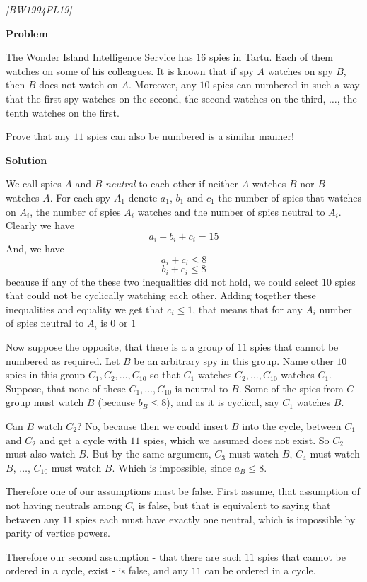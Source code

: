 
%
%

\renewcommand{\theenumi}{\alph{enumi}}



\noindent
 
\filbreak

\begin{problem}
\textit{[BW1994PL19]}


\textbf{Problem}

The Wonder Island Intelligence Service has $16$ spies in Tartu. Each of them watches on some of his colleagues. It is known that if spy $A$ watches on spy $B$, then $B$ does not watch on $A$. Moreover, any $10$ spies can numbered in such a way that the first spy watches on the second, the second watches on the third, $ \dots $, the tenth watches on the first. 

Prove that any $11$ spies can also be numbered is a similar manner!


\textbf{Solution}

We call spies $A$ and $B$ \textit{neutral} to each other if neither $A$ watches $B$ nor $B$ watches $A$. For each spy $A_1$ denote $a_1$, $b_1$ and $c_1$ the number of spies that watches on $A_i$, the number of spies $A_i$ watches and the number of spies neutral to $A_i$. Clearly we have
$$
a_i+b_i+c_i = 15
$$
And, we have 
$$
a_i+c_i \le 8
$$
$$
b_i+c_i \le 8
$$
because if any of the these two inequalities did not hold, we could select $10$ spies that could not be cyclically watching each other. Adding together these inequalities and equality we get that $c_i \le 1$, that means that for any $A_i$ number of spies neutral to $A_i$ is $0$ or $1$

Now suppose the opposite, that there is a a group of $11$ spies that cannot be numbered as required. Let $B$ be an arbitrary spy in this group. Name other $10$ spies in this group $C_1, C_2, \dots, C_{10}$ so that $C_1$ watches $C_2, \dots, C_{10}$ watches $C_1$. Suppose, that none of these $C_1, \dots, C_{10}$ is neutral to $B$. Some of the spies from $C$ group must watch $B$ (because $b_B \le 8$), and as it is cyclical, say $C_1$ watches $B$. 

Can $B$ watch $C_2$? No, because then we could insert $B$ into the cycle, between $C_1$ and $C_2$ and get a cycle with $11$ spies, which we assumed does not exist. So $C_2$ must also watch $B$. But by the same argument, $C_3$ must watch $B$, $C_4$ must watch $B$, $\dots$, $C_{10}$ must watch $B$. Which is impossible, since $a_B \le 8$. 

Therefore one of our assumptions must be false. First assume, that assumption of not having neutrals among $C_i$ is false, but that is equivalent to saying that between any $11$ spies each must have exactly one neutral, which is impossible by parity of vertice powers.

Therefore our second assumption - that there are such $11$ spies that cannot be ordered in a cycle, exist - is false, and any $11$ can be ordered in a cycle.
\end{problem}
%

